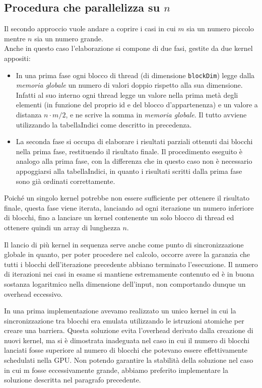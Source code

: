 \documentclass[a4paper]{article}   %
\begin{document}
\subsection{Procedura che parallelizza su $n$}
Il secondo approccio vuole andare a coprire i casi in cui $m$ sia un numero piccolo mentre $n$ sia un numero grande. \\
Anche in questo caso l’elaborazione si compone di due fasi, gestite da due kernel appositi:
\begin{itemize}
\item In una prima fase ogni blocco di thread (di dimensione {\tt blockDim}) legge dalla \emph{memoria globale} un numero di valori doppio rispetto alla sua dimensione. Infatti al suo interno ogni thread legge un valore nella prima metà degli elementi (in funzione del proprio id e del blocco d’appartenenza) e un valore a distanza $n \cdot m/2$, e ne scrive la somma in \emph{memoria globale}. Il tutto avviene utilizzando la tabellaIndici come descritto in precedenza.
\item La seconda fase si occupa di elaborare i risultati parziali ottenuti dai blocchi nella prima fase, restituendo il risultato finale. Il procedimento eseguito è analogo alla prima fase, con la differenza che in questo caso non è necessario appoggiarsi alla tabellaIndici, in quanto i risultati scritti dalla prima fase sono già ordinati correttamente. 
\end{itemize}
Poiché un singolo kernel potrebbe non essere sufficiente per ottenere il risultato finale, questa fase viene iterata, lanciando ad ogni iterazione un numero inferiore di blocchi, fino a lanciare un kernel contenente un solo blocco di thread ed ottenere quindi un array di lunghezza $n$. 

Il lancio di più kernel in sequenza serve anche come punto di sincronizzazione globale in quanto, per poter procedere nel calcolo, occorre avere la garanzia che tutti i blocchi dell’iterazione precedente abbiano terminato l’esecuzione. Il numero di iterazioni nei casi in esame si mantiene estremamente contenuto ed è in buona sostanza logaritmico nella dimensione dell’input, non comportando dunque un overhead eccessivo. 

In una prima implementazione avevamo realizzato un unico kernel in cui la sincronizzazione tra blocchi era emulata utilizzando le istruzioni atomiche per creare una barriera. Questa soluzione evita l’overhead derivato dalla creazione di nuovi kernel, ma si è dimostrata inadeguata nel caso in cui il numero di blocchi lanciati fosse superiore al numero di blocchi che potevano essere effettivamente schedulati nella GPU. Non potendo garantire la stabilità della soluzione nel caso in cui m fosse eccessivamente grande, abbiamo preferito implementare la soluzione descritta nel paragrafo precedente.
\end{document}
